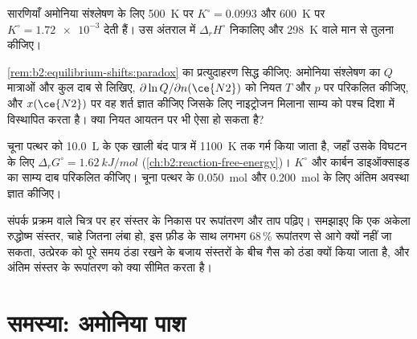 \begin{exercise}[$\star\star$]\label{exo:b2:equilibrium-shifts:9}
सारणियाँ अमोनिया संश्लेषण के लिए \qty{500}{K} पर $K^\circ = 0.0993$ और
\qty{600}{K} पर $K^\circ = \num{1.72e-3}$ देती हैं। उस अंतराल में $\Delta_r H^\circ$
निकालिए और \qty{298}{K} वाले मान से तुलना कीजिए।
\end{exercise}

\begin{exercise}[$\star\star\star$]\label{exo:b2:equilibrium-shifts:10}
\cref{rem:b2:equilibrium-shifts:paradox} का प्रत्युदाहरण सिद्ध कीजिए: अमोनिया संश्लेषण का
$Q$ मात्राओं और कुल दाब से लिखिए, $\partial\ln Q/\partial n(\ce{N2})$ को नियत
$T$ और $p$ पर परिकलित कीजिए, और
$x(\ce{N2})$ पर वह शर्त ज्ञात कीजिए जिसके लिए नाइट्रोजन मिलाना साम्य को
पश्च दिशा में विस्थापित करता है। क्या नियत आयतन पर भी ऐसा हो सकता है?
\end{exercise}

\begin{exercise}[$\star\star\star$]\label{exo:b2:equilibrium-shifts:11}
चूना पत्थर को \qty{10.0}{L} के एक खाली बंद पात्र में
\qty{1100}{K} तक गर्म किया जाता है, जहाँ उसके विघटन के लिए $\Delta_r G^\circ = \qty{1.62}{kJ/mol}$
(\cref{ch:b2:reaction-free-energy})। $K^\circ$ और
कार्बन डाइऑक्साइड का साम्य दाब परिकलित कीजिए। चूना पत्थर के
\qty{0.050}{mol} और \qty{0.200}{mol} के लिए अंतिम अवस्था ज्ञात कीजिए।
\end{exercise}

\begin{exercise}[$\star\star\star$]\label{exo:b2:equilibrium-shifts:12}
संपर्क प्रक्रम वाले चित्र पर हर संस्तर के निकास पर रूपांतरण और ताप पढ़िए।
समझाइए कि एक अकेला रुद्धोष्म संस्तर, चाहे जितना लंबा हो, इस फ़ीड के साथ लगभग
68\,\% रूपांतरण से आगे क्यों नहीं जा सकता, उत्प्रेरक को पूरे समय ठंडा रखने के बजाय
संस्तरों के बीच गैस को ठंडा क्यों किया जाता है, और अंतिम संस्तर के रूपांतरण को
क्या सीमित करता है।
\end{exercise}

\section{समस्या: अमोनिया पाश}

